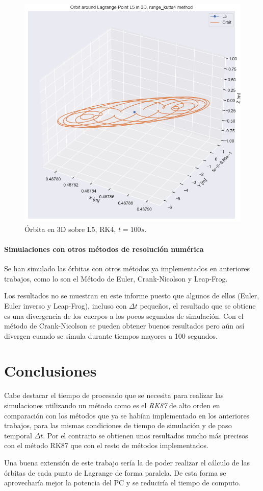 \documentclass[12pt,a4paper]{article}
\begin{document}
\begin{figure}[H]
	\centering
	\includegraphics[width=\x\textwidth]{FIGURES/mil6/L5_orbit_rk4_t100.png}
	\caption{Órbita en 3D sobre L5, RK4, $t = 100 s$.}
	\label{L5_orbit_rk4_t100}
\end{figure}

\paragraph{Simulaciones con otros métodos de resolución numérica}
Se han simulado las órbitas con otros métodos ya implementados en anteriores trabajos, como lo son el Método de Euler, Crank-Nicolson y Leap-Frog. 

Los resultados no se muestran en este informe puesto que algunos de ellos (Euler, Euler inverso y Leap-Frog), incluso con $\Delta t$ pequeños, el resultado que se obtiene es una divergencia de los cuerpos a los pocos segundos de simulación. Con el método de Crank-Nicolson se pueden obtener buenos resultados pero aún así divergen cuando se simula durante tiempos mayores a 100 segundos.



\section{Conclusiones} %
Cabe destacar el tiempo de procesado que se necesita para realizar las simulaciones utilizando un método como es el \textit{RK87} de alto orden en comparación con los métodos que ya se habían implementado en los anteriores trabajos, para las mismas condiciones de tiempo de simulación y de paso temporal $\Delta t$. Por el contrario se obtienen unos resultados mucho más precisos con el método RK87 que con el resto de métodos implementados.

Una buena extensión de este trabajo sería la de poder realizar el cálculo de las órbitas de cada punto de Lagrange de forma paralela. De esta forma se aprovecharía mejor la potencia del PC y se reduciría el tiempo de computo. 
\end{document}
